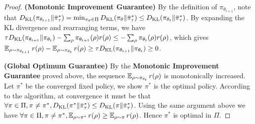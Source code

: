 \begin{proof}
	{\bf (Monotonic Improvement Guarantee)} By the definition of $\pi_{\theta_{t+1}}$, note that $D_{\mathrm{KL}}(\pi_{\theta_{t+1}} \| \bar{\pi}_\tau^*)  = \min_{\pi_\theta \in \Pi}{ D_{\mathrm{KL}}(\pi_\theta \| \bar{\pi}_\tau^*)} \leq D_{\mathrm{KL}}(\pi_{\theta_{t}} \| \bar{\pi}_\tau^*)$. By expanding the KL divergence and rearranging terms, we have $ \tau D_{\mathrm{KL}}(\pi_{\theta_{t+1}} \| \pi_{\theta_{t}}) - \sum_{\rho}{ \pi_{\theta_{t+1}}(\rho) r(\rho) } \leq - \sum_{\rho}{ \pi_{\theta_{t}}(\rho) r(\rho) }$, which gives $\operatorname*{\mathbb{E}}_{\rho \sim \pi_{\theta_{t+1}}}{  r(\rho)} - \operatorname*{\mathbb{E}}_{\rho \sim \pi_{\theta_{t}}}{  r(\rho)} \geq \tau D_{\mathrm{KL}}(\pi_{\theta_{t+1}} \| \pi_{\theta_{t}}) \geq 0$.
	
	{\bf (Global Optimum Guarantee)} By the {\bf Monotonic Improvement Guarantee} proved above, the sequence $\operatorname{\mathbb{E}}_{\rho \sim \pi_{\theta_t}}{ r(\rho)}$ is monotonically increased. Let $\pi^*$ be the converged fixed policy, we show $\pi^*$ is the optimal policy. According to the algorithm, at convergence it must be that $\forall \pi\in \Pi, \pi\neq \pi^*, D_{\mathrm{KL}}(\pi^* \| \bar{\pi}_\tau^*) \leq D_{\mathrm{KL}}(\pi \| \bar{\pi}_\tau^*)$. Using the same argument above we have $\forall \pi\in \Pi, \pi\neq \pi^*, \operatorname{\mathbb{E}}_{\rho \sim \pi^*}{ r(\rho)} \geq \operatorname{\mathbb{E}}_{\rho \sim \pi}{ r(\rho)}$. Hence $\pi^*$ is optimal in $\Pi$. 
	

\end{proof}
